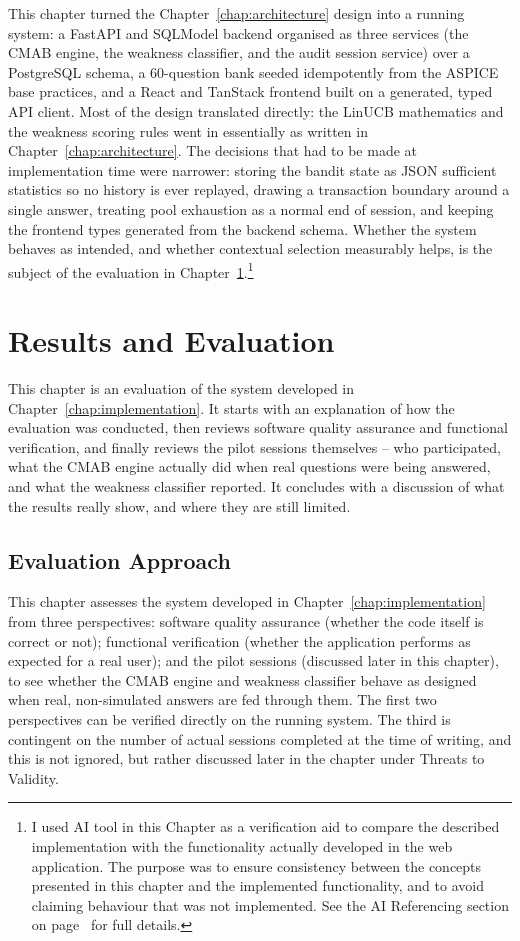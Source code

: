 \documentclass[a4paper, 12pt, oneside, openany, BCOR1cm,toc=chapterentrywithdots]{scrbook}
\begin{document}
This chapter turned the Chapter~\ref{chap:architecture} design into a running system: a FastAPI
and SQLModel backend organised as three services (the CMAB engine, the weakness classifier,
and the audit session service) over a PostgreSQL schema, a 60-question bank seeded
idempotently from the ASPICE base practices, and a React and TanStack frontend built on a
generated, typed API client. Most of the design translated directly: the LinUCB mathematics and
the weakness scoring rules went in essentially as written in Chapter~\ref{chap:architecture}.
The decisions that had to be made at implementation time were narrower: storing the bandit
state as JSON sufficient statistics so no history is ever replayed, drawing a transaction
boundary around a single answer, treating pool exhaustion as a normal end of session, and
keeping the frontend types generated from the backend schema. Whether the system behaves as
intended, and whether contextual selection measurably helps, is the subject of the evaluation in
Chapter~\ref{chap:results}.\footnote{I used AI tool in this Chapter as a verification aid to compare the
described implementation with the functionality actually developed in the web application. The
purpose was to ensure consistency between the concepts presented in this chapter and the
implemented functionality, and to avoid claiming behaviour that was not implemented. See the AI
Referencing section on page~\pageref{app:ai-referencing} for full details.}

\chapter{Results and Evaluation}
\label{chap:results}
% 

This chapter is an evaluation of the system developed in Chapter~\ref{chap:implementation}. It
starts with an explanation of how the evaluation was conducted, then reviews software quality
assurance and functional verification, and finally reviews the pilot sessions themselves -- who
participated, what the CMAB engine actually did when real questions were being answered, and
what the weakness classifier reported. It concludes with a discussion of what the results really
show, and where they are still limited.

\section{Evaluation Approach}

This chapter assesses the system developed in Chapter~\ref{chap:implementation} from three
perspectives: software quality assurance (whether the code itself is correct or not); functional
verification (whether the application performs as expected for a real user); and the pilot
sessions (discussed later in this chapter), to see whether the CMAB engine and weakness
classifier behave as designed when real, non-simulated answers are fed through them. The first
two perspectives can be verified directly on the running system. The third is contingent on the
number of actual sessions completed at the time of writing, and this is not ignored, but rather
discussed later in the chapter under Threats to Validity.
\end{document}

